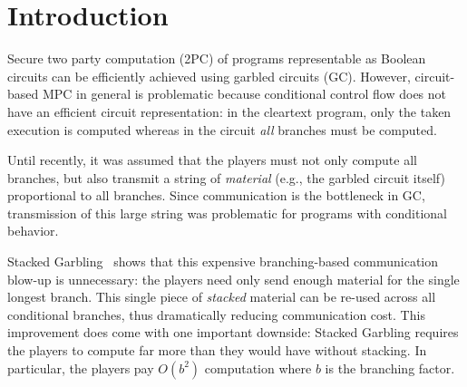 \section{Introduction}\label{sec:intro}

Secure two party computation (2PC) of programs representable as Boolean circuits can be efficiently achieved using garbled circuits (GC).
%
However,  circuit-based MPC in general is problematic because conditional
control flow does not have an efficient circuit representation:
in the cleartext program, only the taken execution is computed whereas in
the circuit \emph{all} branches must be computed.

%
Until recently, it was assumed that the players must not only compute
all branches, but also transmit a string of \emph{material} (e.g., the garbled circuit itself) 
proportional to all branches.  
Since communication is the bottleneck in GC, transmission of this large string was
problematic for programs with conditional behavior.

Stacked Garbling~\cite{EPRINT:HeaKol20b} shows that
this expensive branching-based communication blow-up is unnecessary: the players need only
send enough material for the single longest branch. This single
piece of \emph{stacked} material can be re-used across all conditional branches, thus
dramatically reducing communication cost.
%
This improvement does come with one important downside:
Stacked Garbling requires the players to compute far more than they
would have without stacking.
In particular, the players pay $O(b^2)$ computation where $b$ is the
branching factor.

